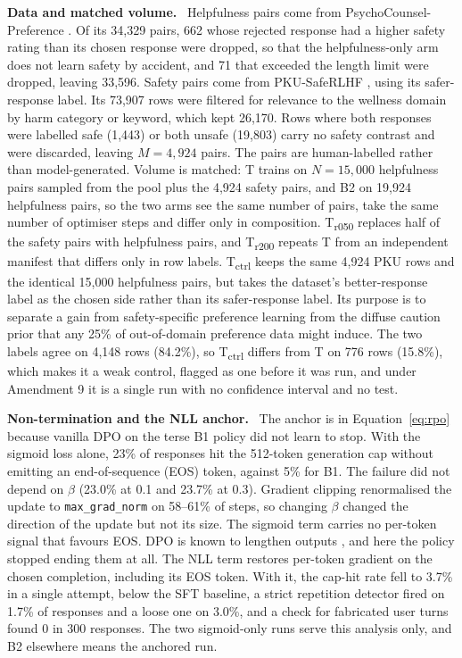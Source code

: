 \documentclass[10pt]{article} %
\newcommand{\Bo}{B1}
\newcommand{\Bt}{B2}
\newcommand{\T}{T}
\newcommand{\Tctrl}{T\textsubscript{ctrl}}
\newcommand{\Trfifty}{T\textsubscript{r050}}
\newcommand{\Trtwo}{T\textsubscript{r200}}
\newcommand{\lead}[1]{\textbf{#1}\ }
\begin{document}
\lead{Data and matched volume.} Helpfulness pairs come from PsychoCounsel-Preference \citep{zhang2026psychocounsel}. Of its 34,329 pairs, 662 whose rejected response had a higher safety rating than its chosen response were dropped, so that the helpfulness-only arm does not learn safety by accident, and 71 that exceeded the length limit were dropped, leaving 33,596. Safety pairs come from PKU-SafeRLHF \citep{ji2024pku}, using its safer-response label. Its 73,907 rows were filtered for relevance to the wellness domain by harm category or keyword, which kept 26,170. Rows where both responses were labelled safe (1,443) or both unsafe (19,803) carry no safety contrast and were discarded, leaving $M=4{,}924$ pairs. The pairs are human-labelled rather than model-generated. Volume is matched: \T{} trains on $N=15{,}000$ helpfulness pairs sampled from the pool plus the 4,924 safety pairs, and \Bt{} on 19,924 helpfulness pairs, so the two arms see the same number of pairs, take the same number of optimiser steps and differ only in composition. \Trfifty{} replaces half of the safety pairs with helpfulness pairs, and \Trtwo{} repeats \T{} from an independent manifest that differs only in row labels. \Tctrl{} keeps the same 4,924 PKU rows and the identical 15,000 helpfulness pairs, but takes the dataset's better-response label as the chosen side rather than its safer-response label. Its purpose is to separate a gain from safety-specific preference learning from the diffuse caution prior that any 25\% of out-of-domain preference data might induce. The two labels agree on 4,148 rows (84.2\%), so \Tctrl{} differs from \T{} on 776 rows (15.8\%), which makes it a weak control, flagged as one before it was run, and under Amendment 9 it is a single run with no confidence interval and no test.

\lead{Non-termination and the NLL anchor.} The anchor is in Equation~\ref{eq:rpo} because vanilla DPO on the terse \Bo{} policy did not learn to stop. With the sigmoid loss alone, 23\% of responses hit the 512-token generation cap without emitting an end-of-sequence (EOS) token, against 5\% for \Bo{}. The failure did not depend on $\beta$ (23.0\% at 0.1 and 23.7\% at 0.3). Gradient clipping renormalised the update to \texttt{max\_grad\_norm} on 58--61\% of steps, so changing $\beta$ changed the direction of the update but not its size. The sigmoid term carries no per-token signal that favours EOS. DPO is known to lengthen outputs \citep{park2024disentangling,lu2024sampo}, and here the policy stopped ending them at all. The NLL term restores per-token gradient on the chosen completion, including its EOS token. With it, the cap-hit rate fell to 3.7\% in a single attempt, below the SFT baseline, a strict repetition detector fired on 1.7\% of responses and a loose one on 3.0\%, and a check for fabricated user turns found 0 in 300 responses. The two sigmoid-only runs serve this analysis only, and \Bt{} elsewhere means the anchored run.
\end{document}
